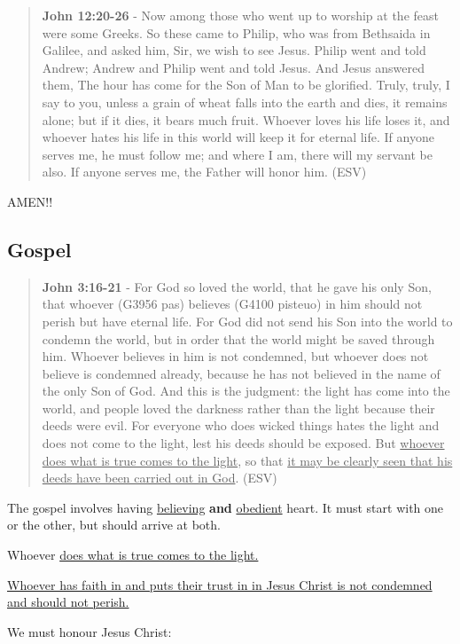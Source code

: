 \documentclass[11pt]{article}
\begin{document}
\begin{quote}
\textbf{John 12:20-26} - Now among those who went up to worship at the feast were some Greeks. So these came to Philip, who was from Bethsaida in Galilee, and asked him, Sir, we wish to see Jesus. Philip went and told Andrew; Andrew and Philip went and told Jesus. And Jesus answered them, The hour has come for the Son of Man to be glorified. Truly, truly, I say to you, unless a grain of wheat falls into the earth and dies, it remains alone; but if it dies, it bears much fruit. Whoever loves his life loses it, and whoever hates his life in this world will keep it for eternal life. If anyone serves me, he must follow me; and where I am, there will my servant be also. If anyone serves me, the Father will honor him. (ESV)
\end{quote}

AMEN!!

\subsection{Gospel}
\label{sec:org90fd09a}
\begin{quote}
\textbf{John 3:16-21} - For God so loved the world, that he gave his only Son, that whoever (G3956 pas) believes (G4100 pisteuo) in him should not perish but have eternal life. For God did not send his Son into the world to condemn the world, but in order that the world might be saved through him. Whoever believes in him is not condemned, but whoever does not believe is condemned already, because he has not believed in the name of the only Son of God. And this is the judgment: the light has come into the world, and people loved the darkness rather than the light because their deeds were evil. For everyone who does wicked things hates the light and does not come to the light, lest his deeds should be exposed. But \uline{whoever does what is true comes to the light}, so that \uline{it may be clearly seen that his deeds have been carried out in God}. (ESV)
\end{quote}

The gospel involves having \uline{believing} \textbf{and} \uline{obedient} heart. It must start with one or the other, but should arrive at both.

Whoever \uline{does what is true comes to the light.}

\uline{Whoever has faith in and puts their trust in in Jesus Christ is not condemned and should not perish.}

We must honour Jesus Christ:
\end{document}
